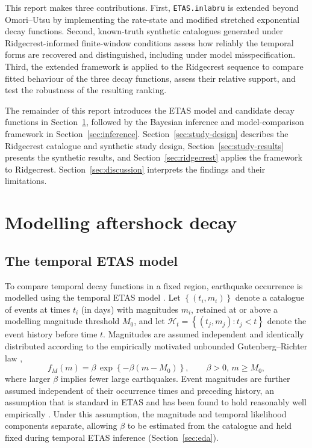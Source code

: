 \documentclass{statsmsc}
\begin{document}
This report makes three contributions. First, \texttt{ETAS.inlabru} is extended beyond Omori--Utsu by implementing the rate-state and modified stretched exponential decay functions. Second, known-truth synthetic catalogues generated under Ridgecrest-informed finite-window conditions assess how reliably the temporal forms are recovered and distinguished, including under model misspecification. Third, the extended framework is applied to the Ridgecrest sequence to compare fitted behaviour of the three decay functions, assess their relative support, and test the robustness of the resulting ranking.

The remainder of this report introduces the ETAS model and candidate decay functions in Section~\ref{sec:model}, followed by the Bayesian inference and model-comparison framework in Section~\ref{sec:inference}. Section~\ref{sec:study-design} describes the Ridgecrest catalogue and synthetic study design, Section~\ref{sec:study-results} presents the synthetic results, and Section~\ref{sec:ridgecrest} applies the framework to Ridgecrest. Section~\ref{sec:discussion} interprets the findings and their limitations.

\section{Modelling aftershock decay}\label{sec:model}

\subsection{The temporal ETAS model} \label{sec:etas} 

To compare temporal decay functions in a fixed region, earthquake occurrence is modelled using the temporal ETAS model \citep{ogata1988statistical}. Let $\left\{(t_i,m_i)\right\}$ denote a catalogue of events at times $t_i$ (in days) with magnitudes $m_i$, retained at or above a modelling magnitude threshold $M_0$, and let $\mathcal{H}_t = \left\{(t_j,m_j):t_j<t\right\}$ denote the event history before time $t$. Magnitudes are assumed independent and identically distributed according to the empirically motivated unbounded Gutenberg--Richter law \citep{gutenberg1944frequency}, 
\begin{equation} \label{eq:gr}
f_M(m) = \beta \, \exp \left\{-\beta(m-M_0)\right\}, \qquad \beta >0, \,m \geq M_0,
\end{equation}
where larger $\beta$ implies fewer large earthquakes. Event magnitudes are further assumed independent of their occurrence times and preceding history, an assumption that is standard in ETAS and has been found to hold reasonably well empirically \citep{schoenberg2004testing,stallone2019empirical}. Under this assumption, the magnitude and temporal likelihood components separate, allowing $\beta$ to be estimated from the catalogue and held fixed during temporal ETAS inference (Section~\ref{sec:eda}). 
\end{document}
